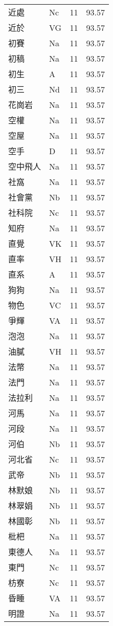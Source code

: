 \documentclass[twocolumn]{book}
\begin{document}
\begin{supertabular}{llrr}
近處 & Nc & 11 &  93.57\\
近於 & VG & 11 &  93.57\\
初賽 & Na & 11 &  93.57\\
初稿 & Na & 11 &  93.57\\
初生 & A & 11 &  93.57\\
初三 & Nd & 11 &  93.57\\
花崗岩 & Na & 11 &  93.57\\
空權 & Na & 11 &  93.57\\
空屋 & Na & 11 &  93.57\\
空手 & D & 11 &  93.57\\
空中飛人 & Na & 11 &  93.57\\
社窩 & Na & 11 &  93.57\\
社會黨 & Nb & 11 &  93.57\\
社科院 & Nc & 11 &  93.57\\
知府 & Na & 11 &  93.57\\
直覺 & VK & 11 &  93.57\\
直率 & VH & 11 &  93.57\\
直系 & A & 11 &  93.57\\
狗狗 & Na & 11 &  93.57\\
物色 & VC & 11 &  93.57\\
爭輝 & VA & 11 &  93.57\\
泡泡 & Na & 11 &  93.57\\
油膩 & VH & 11 &  93.57\\
法幣 & Na & 11 &  93.57\\
法門 & Na & 11 &  93.57\\
法拉利 & Na & 11 &  93.57\\
河馬 & Na & 11 &  93.57\\
河段 & Na & 11 &  93.57\\
河伯 & Nb & 11 &  93.57\\
河北省 & Nc & 11 &  93.57\\
武帝 & Nb & 11 &  93.57\\
林默娘 & Nb & 11 &  93.57\\
林翠娟 & Nb & 11 &  93.57\\
林國彰 & Nb & 11 &  93.57\\
枇杷 & Na & 11 &  93.57\\
東德人 & Na & 11 &  93.57\\
東門 & Nc & 11 &  93.57\\
枋寮 & Nc & 11 &  93.57\\
昏睡 & VA & 11 &  93.57\\
明證 & Na & 11 &  93.57\\

\end{supertabular}
\end{document}
